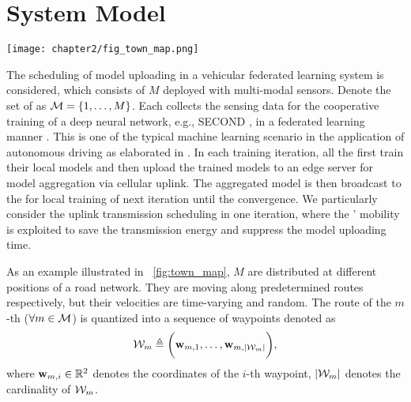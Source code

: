 \section{System Model}
\label{sec:chapter2-model}

\begin{figure*}[htp!]
    \centering
    \texttt{[image: chapter2/fig\_town\_map.png]}
    \caption{The illustration of the road map in the simulator.}
    \label{fig:town_map}
\end{figure*}

The scheduling of model uploading in a vehicular federated learning system is considered, which consists of $M$ {\IAVs} deployed with multi-modal sensors.
Denote the set of {\IAVs} as $\mathcal{M} = \{1, \dots, M\}$.
Each {\IAV} collects the sensing data for the cooperative training of a deep neural network, e.g., SECOND \cite{SECOND}, in a federated learning manner \cite{FedAvg}.
This is one of the typical machine learning scenario in the application of autonomous driving as elaborated in \cite{icra2021-hong}.
In each training iteration, all the {\IAVs} first train their local models and then upload the trained models to an edge server for model aggregation via cellular uplink.
The aggregated model is then broadcast to the {\IAVs} for local training of next iteration until the convergence.
We particularly consider the uplink transmission scheduling in one iteration, where the {\IAVs}' mobility is exploited to save the transmission energy and suppress the model uploading time.

As an example illustrated in \figurename~\ref{fig:town_map}, $M$ {\IAVs} are distributed at different positions of a road network.
They are moving along predetermined routes respectively, but their velocities are time-varying and random.
The route of the $m$-th {\IAV} ($\forall m\in\mathcal{M}$) is quantized into a sequence of waypoints denoted as
\begin{align*}
    \mathcal{W}_{m} \triangleq \bigg( \mathbf{w}_{m,1}, \dots, \mathbf{w}_{m,|\mathcal{W}_{m}|} \bigg),
\end{align*}
where $\mathbf{w}_{m,i} \in \mathbb{R}^2$ denotes the coordinates of the $i$-th waypoint,
$|\mathcal{W}_m|$ denotes the cardinality of $\mathcal{W}_m$.

